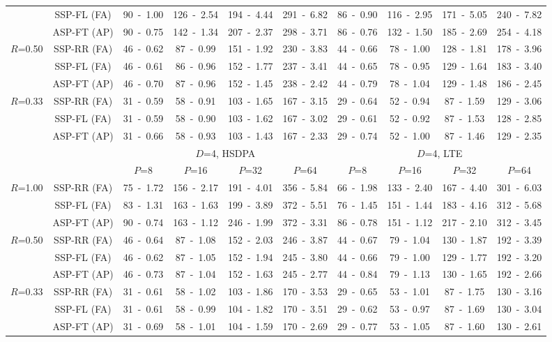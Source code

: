 \documentclass[10pt,twocolumn,journal]{IEEEtran}
\begin{document}
\begin{table*}[t!]
{\begin{tabular}{|c|c|c|c|c|c|c|c|c|c|}
& SSP-FL (FA) & 90~-~1.00 & 126~-~2.54 & 194~-~4.44 & 291~-~6.82 
& 86~-~0.90 & 116~-~2.95 & 171~-~5.05 & 240~-~7.82 \\
& ASP-FT (AP) & 90~-~0.75 & 142~-~1.34 & 207~-~2.37 & 298~-~3.71 
& 86~-~0.76 & 132~-~1.50 & 185~-~2.69 & 254~-~4.18 \\
\hline
\multirow{3}{*}{$R$=0.50} & SSP-RR (FA) & 46~-~0.62 & 87~-~0.99 & 151~-~1.92 & 230~-~3.83 
& 44~-~0.66 & 78~-~1.00 & 128~-~1.81 & 178~-~3.96 \\
& SSP-FL (FA) & 46~-~0.61 & 86~-~0.96 & 152~-~1.77 & 237~-~3.41 
& 44~-~0.65 & 78~-~0.95 & 129~-~1.64 & 183~-~3.40 \\
& ASP-FT (AP) & 46~-~0.70 & 87~-~0.96 & 152~-~1.45 & 238~-~2.42 
& 44~-~0.79 & 78~-~1.04 & 129~-~1.48 & 186~-~2.45 \\
\hline
\multirow{3}{*}{$R$=0.33} & SSP-RR (FA) & 31~-~0.59 & 58~-~0.91 & 103~-~1.65 & 167~-~3.15 
& 29~-~0.64 & 52~-~0.94 & 87~-~1.59 & 129~-~3.06 \\
& SSP-FL (FA) & 31~-~0.59 & 58~-~0.90 & 103~-~1.62 & 167~-~3.02 
& 29~-~0.61 & 52~-~0.92 & 87~-~1.53 & 128~-~2.85 \\
& ASP-FT (AP) & 31~-~0.66 & 58~-~0.93 & 103~-~1.43 & 167~-~2.33 
& 29~-~0.74 & 52~-~1.00 & 87~-~1.46 & 129~-~2.35 \\
\hline
\hline
& 	 & \multicolumn{4}{c|}{$D$=4, HSDPA} & \multicolumn{4}{c|}{$D$=4, LTE} \\
\hline
& 	 & $P$=8 & $P$=16 & $P$=32 & $P$=64  & $P$=8 & $P$=16 & $P$=32 & $P$=64 \\
\hline
\multirow{3}{*}{$R$=1.00} & SSP-RR (FA) & 75~-~1.72 & 156~-~2.17 & 191~-~4.01 & 356~-~5.84 
& 66~-~1.98 & 133~-~2.40 & 167~-~4.40 & 301~-~6.03 \\
& SSP-FL (FA) & 83~-~1.31 & 163~-~1.63 & 199~-~3.89 & 372~-~5.51 
& 76~-~1.45 & 151~-~1.44 & 183~-~4.16 & 312~-~5.68 \\
& ASP-FT (AP) & 90~-~0.74 & 163~-~1.12 & 246~-~1.99 & 372~-~3.31 
& 86~-~0.78 & 151~-~1.12 & 217~-~2.10 & 312~-~3.45 \\
\hline
\multirow{3}{*}{$R$=0.50} & SSP-RR (FA) & 46~-~0.64 & 87~-~1.08 & 152~-~2.03 & 246~-~3.87 
& 44~-~0.67 & 79~-~1.04 & 130~-~1.87 & 192~-~3.39 \\
& SSP-FL (FA) & 46~-~0.62 & 87~-~1.05 & 152~-~1.94 & 245~-~3.80 
& 44~-~0.66 & 79~-~1.00 & 129~-~1.77 & 192~-~3.20 \\
& ASP-FT (AP) & 46~-~0.73 & 87~-~1.04 & 152~-~1.63 & 245~-~2.77 
& 44~-~0.84 & 79~-~1.13 & 130~-~1.65 & 192~-~2.66 \\
\hline
\multirow{3}{*}{$R$=0.33} & SSP-RR (FA) & 31~-~0.61 & 58~-~1.02 & 103~-~1.86 & 170~-~3.53 
& 29~-~0.65 & 53~-~1.01 & 87~-~1.75 & 130~-~3.16 \\
& SSP-FL (FA) & 31~-~0.61 & 58~-~0.99 & 104~-~1.82 & 170~-~3.51 
& 29~-~0.62 & 53~-~0.97 & 87~-~1.69 & 130~-~3.04 \\
& ASP-FT (AP) & 31~-~0.69 & 58~-~1.01 & 104~-~1.59 & 170~-~2.69 
& 29~-~0.77 & 53~-~1.05 & 87~-~1.60 & 130~-~2.61 \\
\hline
\end{tabular}
}
\end{table*}
\end{document}
